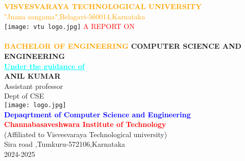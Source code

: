 \documentclass[12pt,a4paper]{article}
\begin{document}
\begin{center}
    

   \textcolor{orange}{\large\textbf{VISVESVARAYA TECHNOLOGICAL UNIVERSITY}\\
   "Jnana sangama",Belagavi-560014,Karnataka}\\
   \vspace{2mm}
   \texttt{[image: vtu logo.jpg]}
   \vspace{2mm}
   \textcolor{red}{A REPORT ON}\\
    \textcolor {red}\\
    \textcolor{ORANGE}{\textbf{BACHELOR OF ENGINEERING}}
    \textbf{COMPUTER SCIENCE AND ENGINEERING}\\
    \vspace{5mm}
    \textcolor{cyan}{\underline{{\textbf{Under the guidance of}}}}\\\large\textbf{ANIL KUMAR}\\
    Assistant professor\\
    Dept of CSE\\
    \centering\texttt{[image:  logo.jpg]}\\
    \textcolor{blue}{\textbf{Depaqrtment of Computer Science and Engineering}}\\
    \textcolor{red}{\textbf{Channabasaveshwara Institute of Technology}}\\
    (Affiliated to Visvesvaraya Technological university)\\
    Sira road ,Tumkuru-572106,Karnataka\\
    2024-2025
\end{center}
\end{document}
